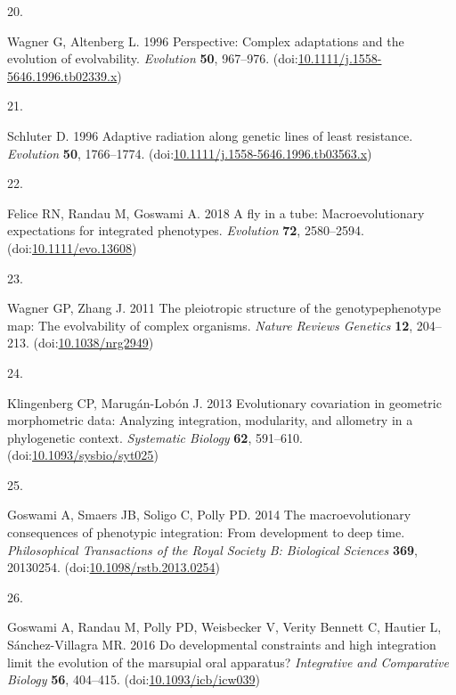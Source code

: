 \documentclass[
  11pt,
]{article}
\newlength{\cslhangindent}
\newlength{\csllabelwidth}
\newlength{\cslentryspacingunit} %
\newenvironment{CSLReferences}[2] %
 {%
  \setlength{\parindent}{0pt}
  \ifodd #1
  \let\oldpar\par
  \def\par{\hangindent=\cslhangindent\oldpar}
  \fi
  \setlength{\parskip}{#2\cslentryspacingunit}
 }%
 {}
\newcommand{\CSLLeftMargin}[1]{\parbox[t]{\csllabelwidth}{#1}}
\newcommand{\CSLRightInline}[1]{\parbox[t]{\linewidth - \csllabelwidth}{#1}\break}
\begin{document}
\begin{CSLReferences}{0}{0}
\leavevmode{}%
\CSLLeftMargin{20. }%
\CSLRightInline{Wagner G, Altenberg L. 1996 Perspective: Complex
adaptations and the evolution of evolvability. \emph{Evolution}
\textbf{50}, 967--976.
(doi:\href{https://doi.org/10.1111/j.1558-5646.1996.tb02339.x}{10.1111/j.1558-5646.1996.tb02339.x})}

\leavevmode{}%
\CSLLeftMargin{21. }%
\CSLRightInline{Schluter D. 1996 Adaptive radiation along genetic lines
of least resistance. \emph{Evolution} \textbf{50}, 1766--1774.
(doi:\href{https://doi.org/10.1111/j.1558-5646.1996.tb03563.x}{10.1111/j.1558-5646.1996.tb03563.x})}

\leavevmode{}%
\CSLLeftMargin{22. }%
\CSLRightInline{Felice RN, Randau M, Goswami A. 2018 A fly in a tube:
Macroevolutionary expectations for integrated phenotypes.
\emph{Evolution} \textbf{72}, 2580--2594.
(doi:\href{https://doi.org/10.1111/evo.13608}{10.1111/evo.13608})}

\leavevmode{}%
\CSLLeftMargin{23. }%
\CSLRightInline{Wagner GP, Zhang J. 2011 The pleiotropic structure of
the genotype{\textendash}phenotype map: The evolvability of complex
organisms. \emph{Nature Reviews Genetics} \textbf{12}, 204--213.
(doi:\href{https://doi.org/10.1038/nrg2949}{10.1038/nrg2949})}

\leavevmode{}%
\CSLLeftMargin{24. }%
\CSLRightInline{Klingenberg CP, Marugán-Lobón J. 2013 Evolutionary
covariation in geometric morphometric data: Analyzing integration,
modularity, and allometry in a phylogenetic context. \emph{Systematic
Biology} \textbf{62}, 591--610.
(doi:\href{https://doi.org/10.1093/sysbio/syt025}{10.1093/sysbio/syt025})}

\leavevmode{}%
\CSLLeftMargin{25. }%
\CSLRightInline{Goswami A, Smaers JB, Soligo C, Polly PD. 2014 The
macroevolutionary consequences of phenotypic integration: From
development to deep time. \emph{Philosophical Transactions of the Royal
Society B: Biological Sciences} \textbf{369}, 20130254.
(doi:\href{https://doi.org/10.1098/rstb.2013.0254}{10.1098/rstb.2013.0254})}

\leavevmode{}%
\CSLLeftMargin{26. }%
\CSLRightInline{Goswami A, Randau M, Polly PD, Weisbecker V, Verity
Bennett C, Hautier L, Sánchez-Villagra MR. 2016 Do developmental
constraints and high integration limit the evolution of the marsupial
oral apparatus? \emph{Integrative and Comparative Biology} \textbf{56},
404--415.
(doi:\href{https://doi.org/10.1093/icb/icw039}{10.1093/icb/icw039})}


\end{CSLReferences}
\end{document}
